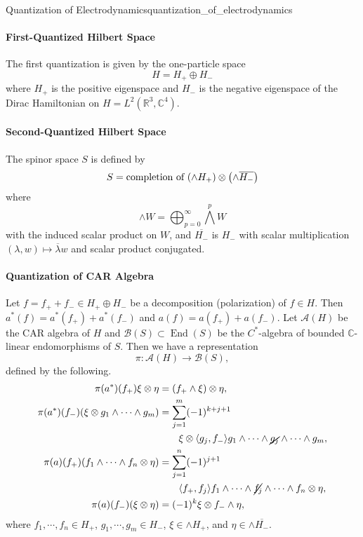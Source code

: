 \documentclass{article}
\begin{document}
\begin{example}{Quantization of Electrodynamics}{quantization_of_electrodynamics}
    \paragraph*{First-Quantized Hilbert Space}
    The first quantization is given by the one-particle space
    \[ H = H_+ \oplus H_- \]
    where $H_+$ is the positive eigenspace and $H_-$ is the negative eigenspace of the Dirac Hamiltonian on $H = L^2(\mathbb{R}^3,\mathbb{C}^4)$.
    \paragraph*{Second-Quantized Hilbert Space}
    The spinor space $S$ is defined by
    \[ S = \text{completion of } \qty(\wedge H_+) \otimes \qty(\wedge \overline{H_-}) \]
    where
    \[ \wedge W = \bigoplus_{p=0}^\infty \bigwedge^p W \]
    with the induced scalar product on $W$,
    and $\overline{H_-}$ is $H_-$ with scalar multiplication $(\lambda,w) \mapsto \overline{\lambda} w$ and scalar product conjugated.
    \paragraph*{Quantization of CAR Algebra}
    Let $f = f_+ + f_- \in H_+ \oplus H_-$ be a decomposition (polarization) of $f\in H$.
    Then $a^*(f) = a^*(f_+) + a^*(f_-)$ and $a(f) = a(f_+) + a(f_-)$.
    Let $\mathscr{A}(H)$ be the CAR algebra of $H$ and $\mathscr{B}(S)\subset \operatorname{End}(S)$ be the $C^*$-algebra of bounded $\mathbb{C}$-linear endomorphisms of $S$.
    Then we have a representation
    \[ \pi: \mathscr{A}(H) \rightarrow \mathscr{B}(S), \]
    defined by the following.
    \begin{align*}
        \pi(a^*)(f_+) \xi\otimes \eta &= (f_+ \wedge \xi) \otimes \eta, \\
        \pi(a^*)(f_-) (\xi\otimes g_1 \wedge \cdots \wedge g_m) &= \sum_{j=1}^{m} (-1)^{k+j+1} \\
        &\qquad \xi \otimes \langle g_j, f_- \rangle g_1 \wedge \cdots \wedge \cancel{g_j} \wedge \cdots \wedge g_m, \\
        \pi(a)(f_+) (f_1 \wedge \cdots \wedge f_n \otimes \eta) &= \sum_{j=1}^{n} (-1)^{j+1} \\
        &\qquad \langle f_+, f_j \rangle f_1 \wedge \cdots \wedge \cancel{f_j} \wedge \cdots \wedge f_n \otimes \eta, \\
        \pi(a)(f_-)(\xi\otimes \eta) &= (-1)^k \xi \otimes f_- \wedge \eta,
    \end{align*}
    where $f_1,\cdots,f_n\in H_+$, $g_1,\cdots,g_m \in H_-$, $\xi \in \wedge H_+$, and $\eta \in \wedge \overline{H_-}$.

\end{example}
\end{document}
